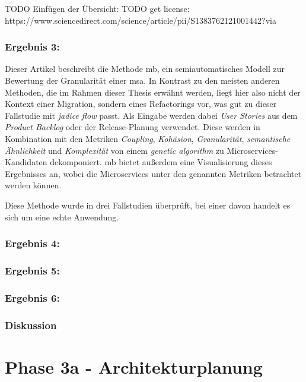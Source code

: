 TODO Einfügen der Übersicht: TODO get license: https://www.sciencedirect.com/science/article/pii/S1383762121001442?via%

\subsubsection{Ergebnis 3: }

Dieser Artikel beschreibt die Methode \gls{mb}, ein semiautomatisches Modell zur Bewertung der Granularität einer \gls{msa}.
In Kontrast zu den meisten anderen Methoden, die im Rahmen dieser Thesis erwähnt werden, liegt hier also nicht der Kontext einer Migration, sondern eines Refactorings vor, was gut zu dieser Fallstudie mit \emph{jadice flow} passt.
Als Eingabe werden dabei \emph{User Stories} aus dem \emph{Product Backlog} oder der Release-Planung verwendet.
Diese werden in Kombination mit den Metriken \emph{Coupling}, \emph{Kohäsion}, \emph{Granularität}, \emph{semantische Ähnlichkeit} und \emph{Komplexität} von einem \emph{genetic algorithm} zu Microservices-Kandidaten dekomponiert.
\gls{mb} bietet außerdem eine Visualisierung dieses Ergebnisses an, wobei die Microservices unter den genannten Metriken betrachtet werden können.

Diese Methode wurde in drei Fallstudien überprüft, bei einer davon handelt es sich um eine echte Anwendung.

\subsubsection{Ergebnis 4: }

\subsubsection{Ergebnis 5: }

\subsubsection{Ergebnis 6: }

\subsubsection{Diskussion}

\section{Phase 3a - Architekturplanung}
\label{sec:durchführung-phase3}